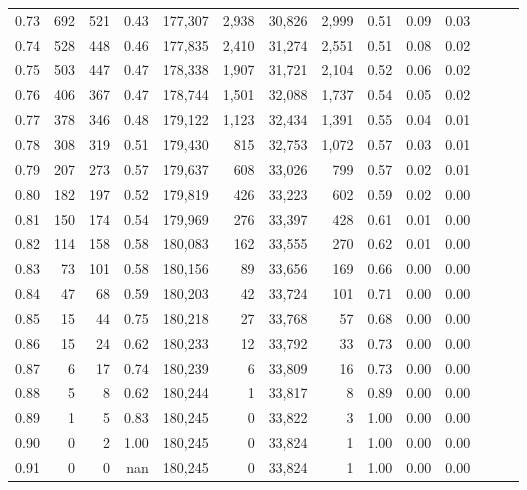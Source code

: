 \begin{tabular}{rrrrrrrrrrrrrr}
0.73 &    692 &    521 &  0.43 &  177,307 &    2,938 &  30,826 &   2,999 &  0.51 &  0.09 &      0.03 \\
0.74 &    528 &    448 &  0.46 &  177,835 &    2,410 &  31,274 &   2,551 &  0.51 &  0.08 &      0.02 \\
0.75 &    503 &    447 &  0.47 &  178,338 &    1,907 &  31,721 &   2,104 &  0.52 &  0.06 &      0.02 \\
0.76 &    406 &    367 &  0.47 &  178,744 &    1,501 &  32,088 &   1,737 &  0.54 &  0.05 &      0.02 \\
0.77 &    378 &    346 &  0.48 &  179,122 &    1,123 &  32,434 &   1,391 &  0.55 &  0.04 &      0.01 \\
0.78 &    308 &    319 &  0.51 &  179,430 &      815 &  32,753 &   1,072 &  0.57 &  0.03 &      0.01 \\
0.79 &    207 &    273 &  0.57 &  179,637 &      608 &  33,026 &     799 &  0.57 &  0.02 &      0.01 \\
0.80 &    182 &    197 &  0.52 &  179,819 &      426 &  33,223 &     602 &  0.59 &  0.02 &      0.00 \\
0.81 &    150 &    174 &  0.54 &  179,969 &      276 &  33,397 &     428 &  0.61 &  0.01 &      0.00 \\
0.82 &    114 &    158 &  0.58 &  180,083 &      162 &  33,555 &     270 &  0.62 &  0.01 &      0.00 \\
0.83 &     73 &    101 &  0.58 &  180,156 &       89 &  33,656 &     169 &  0.66 &  0.00 &      0.00 \\
0.84 &     47 &     68 &  0.59 &  180,203 &       42 &  33,724 &     101 &  0.71 &  0.00 &      0.00 \\
0.85 &     15 &     44 &  0.75 &  180,218 &       27 &  33,768 &      57 &  0.68 &  0.00 &      0.00 \\
0.86 &     15 &     24 &  0.62 &  180,233 &       12 &  33,792 &      33 &  0.73 &  0.00 &      0.00 \\
0.87 &      6 &     17 &  0.74 &  180,239 &        6 &  33,809 &      16 &  0.73 &  0.00 &      0.00 \\
0.88 &      5 &      8 &  0.62 &  180,244 &        1 &  33,817 &       8 &  0.89 &  0.00 &      0.00 \\
0.89 &      1 &      5 &  0.83 &  180,245 &        0 &  33,822 &       3 &  1.00 &  0.00 &      0.00 \\
0.90 &      0 &      2 &  1.00 &  180,245 &        0 &  33,824 &       1 &  1.00 &  0.00 &      0.00 \\
0.91 &      0 &      0 &   nan &  180,245 &        0 &  33,824 &       1 &  1.00 &  0.00 &      0.00 \\

\end{tabular}
